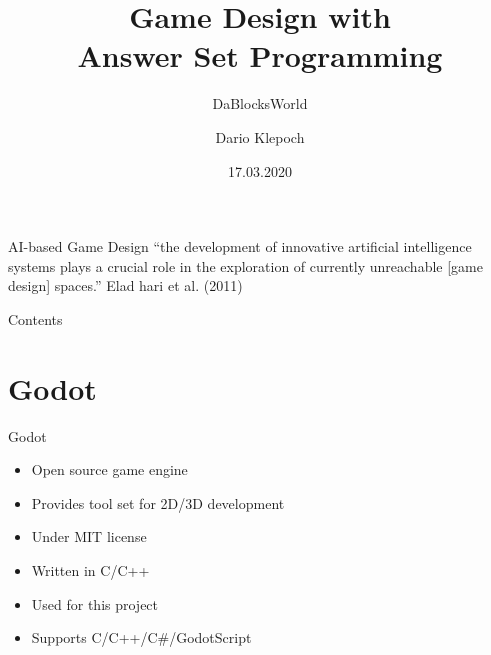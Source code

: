 \documentclass[12pt]{beamer}
\title{Game Design with \\ Answer Set Programming}
\subtitle{DaBlocksWorld}
\author{Dario Klepoch}
\date{17.03.2020}
\institute{Universität Potsdam}
\begin{document}
    \lstset{
        language=prolog,
        autogobble=true 
    }

    \maketitle

    \begin{frame}[fragile]{AI-based Game Design}
        ``the development of innovative artificial intelligence systems plays a crucial role
        in the exploration of currently unreachable [game design] spaces.''
        \newline
        \newline
        \newline
        \newline
        \tiny{Elad hari et al. (2011)}
    \end{frame}
    
    \begin{frame}[fragile]{Contents}
        \tableofcontents[hidesubsections]
    \end{frame}


    \section{Godot}
        \begin{frame}[fragile]{Godot}
           \begin{itemize}
               \item Open source game engine
               \item Provides tool set for 2D/3D development
               \item Under MIT license
               \item Written in C/C++
               \item Used for this project
               \item Supports C/C++/C\#/GodotScript 
           \end{itemize} 
        \end{frame}
\end{document}
